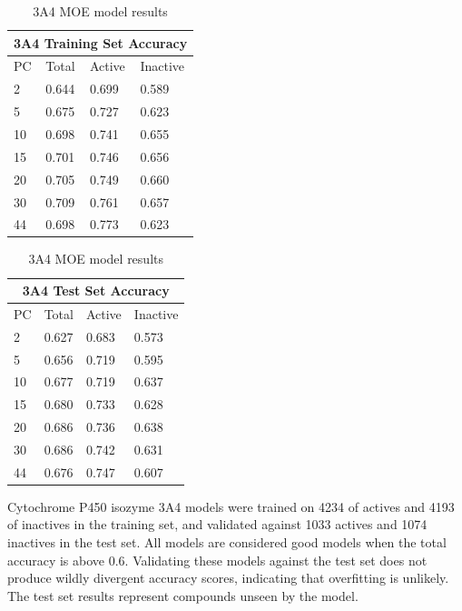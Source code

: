 \begin{table}[!htbp]
\begin{minipage}{.5\linewidth}
\centering
\begin{tabular}{|l|l|l|l|}
\hline
\multicolumn{4}{|c|}{3A4 Training Set Accuracy} \\ \hline
PC & Total          & Active          & Inactive \\ \hline
2  & 0.644          & 0.699           & 0.589   \\ \hline
5  & 0.675          & 0.727           & 0.623   \\ \hline
10 & 0.698          & 0.741           & 0.655   \\ \hline
15 & 0.701          & 0.746           & 0.656   \\ \hline
20 & 0.705          & 0.749           & 0.660   \\ \hline
30 & 0.709          & 0.761           & 0.657   \\ \hline
44 & 0.698          & 0.773           & 0.623   \\ \hline
\end{tabular}
\end{minipage}
\begin{minipage}{.5\linewidth}
\centering
\begin{tabular}{|l|l|l|l|}
\hline
\multicolumn{4}{|c|}{3A4 Test Set Accuracy}      \\ \hline
PC & Total          & Active          & Inactive \\ \hline
2  & 0.627          & 0.683           & 0.573    \\ \hline
5  & 0.656          & 0.719           & 0.595    \\ \hline
10 & 0.677          & 0.719           & 0.637    \\ \hline
15 & 0.680          & 0.733           & 0.628    \\ \hline
20 & 0.686          & 0.736           & 0.638    \\ \hline
30 & 0.686          & 0.742           & 0.631    \\ \hline
44 & 0.676          & 0.747           & 0.607    \\ \hline
\end{tabular}
\end{minipage}
\caption{3A4 MOE model results}
\end{table}

Cytochrome P450 isozyme 3A4 models were trained on 4234 of actives and 4193 of inactives in the training set, and validated against 1033 actives and 1074 inactives in the test set. All models are considered good models when the  total accuracy is above 0.6. Validating these models against the test set does not produce wildly divergent accuracy scores, indicating that overfitting is unlikely. The test set results represent compounds unseen by the model. 

